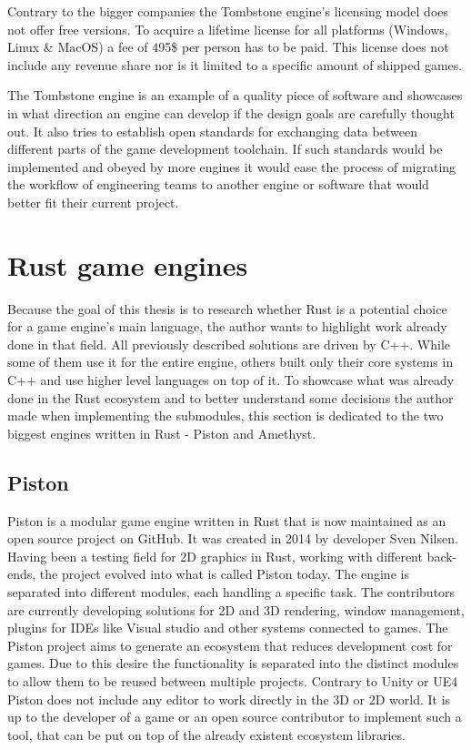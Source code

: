 Contrary to the bigger companies the Tombstone engine's licensing model does not offer free versions. To acquire a lifetime license for all platforms (Windows, Linux \& MacOS) a fee of 495\$ per person has to be paid. This license does not include any revenue share nor is it limited to a specific amount of shipped games.

The Tombstone engine is an example of a quality piece of software and showcases in what direction an engine can develop if the design goals are carefully thought out. It also tries to establish open standards for exchanging data between different parts of the game development toolchain. If such standards would be implemented and obeyed by more engines it would ease the process of migrating the workflow of engineering teams to another engine or software that would better fit their current project. \cite{Tombstone}

\section{Rust game engines}

Because the goal of this thesis is to research whether Rust is a potential choice for a game engine's main language, the author wants to highlight work already done in that field. All previously described solutions are driven by C++. While some of them use it for the entire engine, others built only their core systems in C++ and use higher level languages on top of it. To showcase what was already done in the Rust ecosystem and to better understand some decisions the author made when implementing the submodules, this section is dedicated to the two biggest engines written in Rust - Piston and Amethyst.

\subsection{Piston}

Piston is a modular game engine written in Rust that is now maintained as an open source project on GitHub. It was created in 2014 by developer Sven Nilsen. Having been a testing field for 2D graphics in Rust, working with different back-ends, the project evolved into what is called Piston today. The engine is separated into different modules, each handling a specific task. The contributors are currently developing solutions for 2D and 3D rendering, window management, plugins for \acp{IDE} like Visual studio and other systems connected to games. The Piston project aims to generate an ecosystem that reduces development cost for games. Due to this desire the functionality is separated into the distinct modules to allow them to be reused between multiple projects. Contrary to Unity or \ac{UE4} Piston does not include any editor to work directly in the 3D or 2D world. It is up to the developer of a game or an open source contributor to implement such a tool, that can be put on top of the already existent ecosystem libraries. \cite{Piston}

